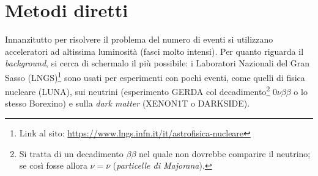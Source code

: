 \section{Metodi diretti}
Innanzitutto per risolvere il problema del numero di eventi si utilizzano acceleratori ad altissima luminosità (fasci molto intensi). Per quanto riguarda il \textit{background}, si cerca di schermalo il più possibile: i Laboratori Nazionali del Gran Sasso (LNGS)\footnote{Link al sito: \url{https://www.lngs.infn.it/it/astrofisica-nucleare}} sono usati per esperimenti con pochi eventi, come quelli di fisica nucleare (LUNA), sui neutrini (esperimento GERDA col decadimento\footnote{Si tratta di un decadimento $\beta\beta$ nel quale non dovrebbe comparire il neutrino; se così fosse allora $\nu=\bar{\nu}$ (\textit{particelle di Majorana}).} $0\nu\beta\beta$ o lo stesso Borexino) e sulla \textit{dark matter} (XENON1T o DARKSIDE).

